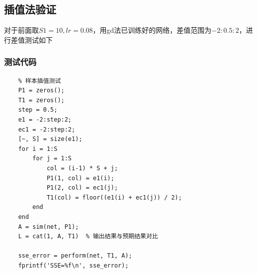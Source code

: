 \documentclass[UTF8]{article}
\begin{document}
\subsection{插值法验证}
对于前面取$S1=10, lr = 0.08$，用gd法已训练好的网络，差值范围为$-2:0.5:2$，进行差值测试如下
\subsubsection{测试代码}
\begin{lstlisting}
    % 样本插值测试
    P1 = zeros();
    T1 = zeros();
    step = 0.5;
    e1 = -2:step:2;
    ec1 = -2:step:2;
    [~, S] = size(e1);
    for i = 1:S
        for j = 1:S
            col = (i-1) * S + j;
            P1(1, col) = e1(i);
            P1(2, col) = ec1(j);
            T1(col) = floor((e1(i) + ec1(j)) / 2);
        end
    end
    A = sim(net, P1);
    L = cat(1, A, T1)  % 输出结果与预期结果对比

    sse_error = perform(net, T1, A);
    fprintf('SSE=%f\n', sse_error);
\end{lstlisting}
\end{document}

